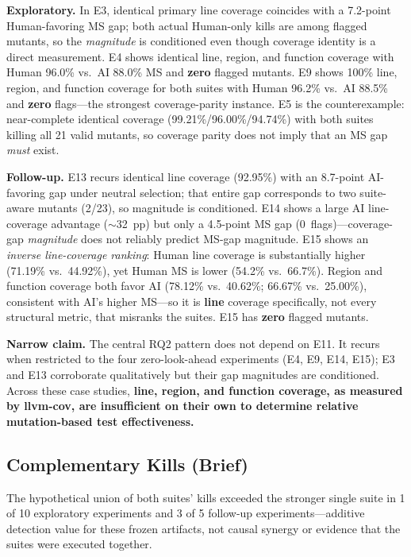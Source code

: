 \documentclass[10pt,conference]{IEEEtran}
\begin{document}
\textbf{Exploratory.} In E3, identical primary line coverage coincides with a 7.2-point Human-favoring MS gap; both actual Human-only kills are among flagged mutants, so the \emph{magnitude} is conditioned even though coverage identity is a direct measurement. E4 shows identical line, region, and function coverage with Human 96.0\% vs.\ AI 88.0\% MS and \textbf{zero} flagged mutants. E9 shows 100\% line, region, and function coverage for both suites with Human 96.2\% vs.\ AI 88.5\% and \textbf{zero} flags---the strongest coverage-parity instance. E5 is the counterexample: near-complete identical coverage (99.21\%/96.00\%/94.74\%) with both suites killing all 21 valid mutants, so coverage parity does not imply that an MS gap \emph{must} exist.

\textbf{Follow-up.} E13 recurs identical line coverage (92.95\%) with an 8.7-point AI-favoring gap under neutral selection; that entire gap corresponds to two suite-aware mutants (2/23), so magnitude is conditioned. E14 shows a large AI line-coverage advantage ($\sim$32~pp) but only a 4.5-point MS gap (0~flags)---coverage-gap \emph{magnitude} does not reliably predict MS-gap magnitude. E15 shows an \emph{inverse line-coverage ranking}: Human line coverage is substantially higher (71.19\% vs.\ 44.92\%), yet Human MS is lower (54.2\% vs.\ 66.7\%). Region and function coverage both favor AI (78.12\% vs.\ 40.62\%; 66.67\% vs.\ 25.00\%), consistent with AI's higher MS---so it is \textbf{line} coverage specifically, not every structural metric, that misranks the suites. E15 has \textbf{zero} flagged mutants.

\textbf{Narrow claim.} The central RQ2 pattern does not depend on E11. It recurs when restricted to the four zero-look-ahead experiments (E4, E9, E14, E15); E3 and E13 corroborate qualitatively but their gap magnitudes are conditioned. Across these case studies, \textbf{line, region, and function coverage, as measured by llvm-cov, are insufficient on their own to determine relative mutation-based test effectiveness.}

\subsection{Complementary Kills (Brief)}
The hypothetical union of both suites' kills exceeded the stronger single suite in 1 of 10 exploratory experiments and 3 of 5 follow-up experiments---additive detection value for these frozen artifacts, not causal synergy or evidence that the suites were executed together.
\end{document}
